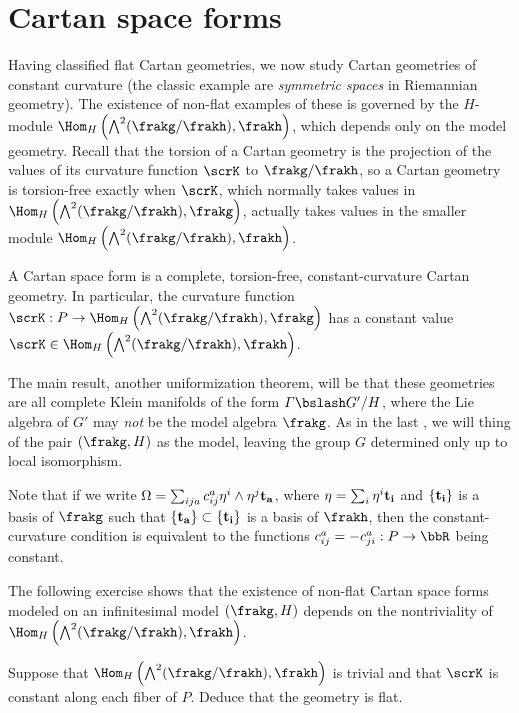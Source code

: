 \section{Cartan space forms}


Having classified flat Cartan geometries, we now study Cartan geometries of constant curvature (the classic example are \emph{symmetric spaces} in Riemannian geometry). The existence of non-flat examples of these is governed by the $H$-module $\Hom_H\left(\bigwedge\nolimits^2(\frakg\slash\frakh),\frakh\right)$, which depends only on the model geometry. Recall that the torsion of a Cartan geometry is the projection of the values of its curvature function $\scrK$ to $\frakg\slash\frakh$, so a Cartan geometry is torsion-free exactly when $\scrK$, which normally takes values in $\Hom_H\left(\bigwedge\nolimits^2(\frakg\slash\frakh),\frakg\right)$, actually takes values in the smaller module $\Hom_H\left(\bigwedge\nolimits^2(\frakg\slash\frakh),\frakh\right)$.

\begin{defn}
    A Cartan space form is a complete, torsion-free, constant-curvature Cartan geometry. In particular, the curvature function $\scrK:P\to \Hom_H\left(\bigwedge\nolimits^2(\frakg\slash\frakh),\frakg\right)$ has a constant value $\scrK\in \Hom_H\left(\bigwedge\nolimits^2(\frakg\slash\frakh),\frakh\right)$.
\end{defn}

The main result, another uniformization theorem, will be that these geometries are all complete Klein manifolds of the form $\varGamma\bslash G'\slash H$, where the Lie algebra of $G'$ may \emph{not} be the model algebra $\frakg$. As in the last \sect, we will thing of the pair $(\frakg,H)$ as the model, leaving the group $G$ determined only up to local isomorphism.

Note that if we write $\Omega=\sum_{ij a}c_{ij}^a\eta^i\wedge\eta^j \bf{t}_a$, where $\eta=\sum_i \eta^i \bf{t}_i$ and $\{\bf{t}_i\}$ is a basis of $\frakg$ such that $\{\bf{t}_a\}\subset\{\bf{t}_i\}$ is a basis of $\frakh$, then the constant-curvature condition is equivalent to the functions $c_{ij}^a=-c_{ji}^a:P\to \bbR$ being constant. 

The following exercise shows that the existence of non-flat Cartan space forms modeled on an infinitesimal model $(\frakg,H)$ depends on the nontriviality of $\Hom_H\left(\bigwedge\nolimits^2(\frakg\slash\frakh),\frakh\right)$.

\begin{xca}
    Suppose that $\Hom_H\left(\bigwedge\nolimits^2(\frakg\slash\frakh),\frakh\right)$ is trivial and that $\scrK$ is constant along each fiber of $P$. Deduce that the geometry is flat.
\end{xca}

